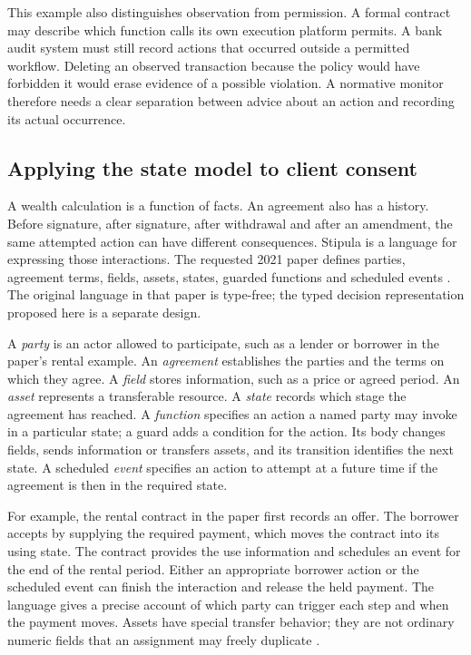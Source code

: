 \documentclass[12pt,a4paper,oneside,openany]{book}
\begin{document}
This example also distinguishes observation from permission. A formal contract
may describe which function calls its own execution platform permits. A bank
audit system must still record actions that occurred outside a permitted
workflow. Deleting an observed transaction because the policy would have
forbidden it would erase evidence of a possible violation. A normative monitor
therefore needs a clear separation between advice about an action and recording
its actual occurrence.

\subsection{Applying the state model to client consent}
\label{merge:P-01a-language-lesson:03}

\label{sec:stipula-tutorial}

A wealth calculation is a function of facts. An agreement also has a history.
Before signature, after signature, after withdrawal and after an amendment, the
same attempted action can have different consequences. Stipula is a language
for expressing those interactions. The requested 2021 paper defines parties,
agreement terms, fields, assets, states, guarded functions and scheduled events
\citep[secs.~3--4]{stipula2021}. The original language in that paper is
type-free; the typed decision representation proposed here is a separate design.

A \emph{party} is an actor allowed to participate, such as a lender or borrower
in the paper's rental example. An \emph{agreement} establishes the parties and
the terms on which they agree. A \emph{field} stores information, such as a price
or agreed period. An \emph{asset} represents a transferable resource. A
\emph{state} records which stage the agreement has reached. A \emph{function}
specifies an action a named party may invoke in a particular state; a guard
adds a condition for the action. Its body changes fields, sends information or
transfers assets, and its transition identifies the next state. A scheduled
\emph{event} specifies an action to attempt at a future time if the agreement
is then in the required state.

For example, the rental contract in the paper first records an offer. The
borrower accepts by supplying the required payment, which moves the contract
into its using state. The contract provides the use information and schedules
an event for the end of the rental period. Either an appropriate borrower action
or the scheduled event can finish the interaction and release the held payment.
The language gives a precise account of which party can trigger each step and
when the payment moves. Assets have special transfer behavior; they are not
ordinary numeric fields that an assignment may freely duplicate
\citep[sec.~3, rental example and grammar]{stipula2021}.
\end{document}
